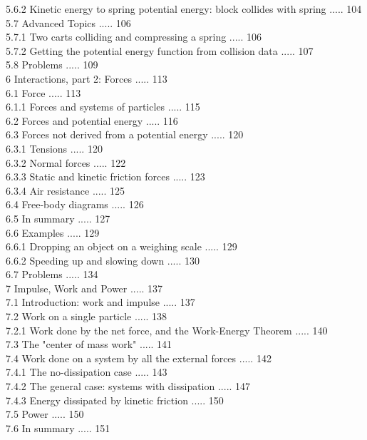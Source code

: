 \documentclass[10pt]{article}
\begin{document}
5.6.2 Kinetic energy to spring potential energy: block collides with spring ..... 104\\
5.7 Advanced Topics ..... 106\\
5.7.1 Two carts colliding and compressing a spring ..... 106\\
5.7.2 Getting the potential energy function from collision data ..... 107\\
5.8 Problems ..... 109\\
6 Interactions, part 2: Forces ..... 113\\
6.1 Force ..... 113\\
6.1.1 Forces and systems of particles ..... 115\\
6.2 Forces and potential energy ..... 116\\
6.3 Forces not derived from a potential energy ..... 120\\
6.3.1 Tensions ..... 120\\
6.3.2 Normal forces ..... 122\\
6.3.3 Static and kinetic friction forces ..... 123\\
6.3.4 Air resistance ..... 125\\
6.4 Free-body diagrams ..... 126\\
6.5 In summary ..... 127\\
6.6 Examples ..... 129\\
6.6.1 Dropping an object on a weighing scale ..... 129\\
6.6.2 Speeding up and slowing down ..... 130\\
6.7 Problems ..... 134\\
7 Impulse, Work and Power ..... 137\\
7.1 Introduction: work and impulse ..... 137\\
7.2 Work on a single particle ..... 138\\
7.2.1 Work done by the net force, and the Work-Energy Theorem ..... 140\\
7.3 The "center of mass work" ..... 141\\
7.4 Work done on a system by all the external forces ..... 142\\
7.4.1 The no-dissipation case ..... 143\\
7.4.2 The general case: systems with dissipation ..... 147\\
7.4.3 Energy dissipated by kinetic friction ..... 150\\
7.5 Power ..... 150\\
7.6 In summary ..... 151\\
\end{document}
